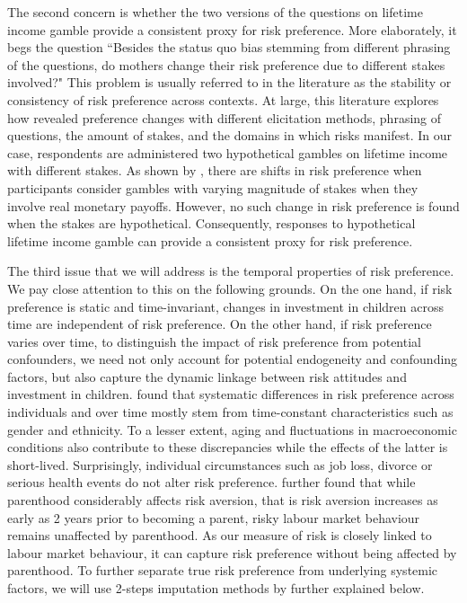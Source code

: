 \documentclass[emulatestandardclasses, 10pt, abstract = true]{scrartcl}
\begin{document}
The second concern is whether the two versions of the questions on lifetime income gamble provide a consistent proxy for risk preference. More elaborately, it begs the question ``Besides the status quo bias stemming from different phrasing of the questions, do mothers change their risk preference due to different stakes involved?" This problem is usually referred to in the literature as the stability or consistency of risk preference across contexts. At large, this literature explores how revealed preference changes with different elicitation methods, phrasing of questions, the amount of stakes, and the domains in which risks manifest. In our case, respondents are administered two hypothetical gambles on lifetime income with different stakes. As shown by \citet{holt2002risk}, there are shifts in risk preference when participants consider gambles with varying magnitude of stakes when they involve real monetary payoffs. However, no such change in risk preference is found when the stakes are hypothetical. Consequently, responses to hypothetical lifetime income gamble can provide a consistent proxy for risk preference.


The third issue that we will address is the temporal properties of risk preference. We pay close attention to this on the following grounds. On the one hand, if risk preference is static and time-invariant, changes in investment in children across time are independent of risk preference. On the other hand, if risk preference varies over time, to distinguish the impact of risk preference from potential confounders, we need not only account for potential endogeneity and confounding factors, but also capture the dynamic linkage between risk attitudes and investment in children. \citet{sahm2012much} found that systematic differences in risk preference across individuals and over time mostly stem from time-constant characteristics such as gender and ethnicity. To a lesser extent, aging and fluctuations in macroeconomic conditions also contribute to these discrepancies while the effects of the latter is short-lived. Surprisingly, individual circumstances such as job loss, divorce or serious health events do not alter risk preference. \citet{gorlitz2020parenthood} further found that while parenthood considerably affects risk aversion, that is risk aversion increases as early as 2 years prior to becoming a parent, risky labour market behaviour remains unaffected by parenthood. As our measure of risk is closely linked to labour market behaviour, it can capture risk preference without being affected by parenthood. To further separate true risk preference from underlying systemic factors, we will use 2-steps imputation methods by \citet{kimball2008imputing,kimball2009risk} further explained below.   
\end{document}
